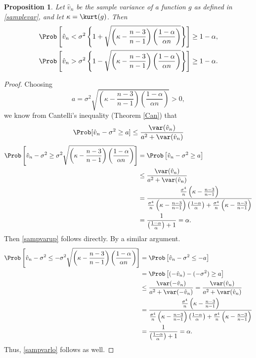 \documentclass[12pt]{amsart}
\newcommand{\hv}{\hat{v}}
\newtheorem{prop}[theorem]{Proposition}
\begin{document}
\begin{prop}\label{propCant} Let $\hv_n$ be the sample variance of a function $g$ as defined in \eqref{samplevar}, and let $\kappa=\kurt(g)$.  Then 
\begin{subequations} \label{sampvarbd}
\begin{gather}\label{sampvarup}
\Prob\left[\hv_n < \sigma^2 \left\{1 + \sqrt{\left ( \kappa  - \frac{n-3}{n-1}\right)\left(\frac{1-\alpha}{\alpha n}\right)}\right\} \right] \ge 1 - \alpha, \\
\label{sampvarlo}
\Prob\left[\hv_n > \sigma^2 \left\{1 - \sqrt{\left ( \kappa  - \frac{n-3}{n-1}\right)\left(\frac{1-\alpha}{\alpha n}\right)}\right\} \right] \ge 1 - \alpha.
\end{gather}
\end{subequations}
\end{prop}
\begin{proof}Choosing 
$$a=\sigma^2\sqrt{\left(\kappa-\frac{n-3}{n-1}\right)\left(\frac{1-\alpha}{\alpha n}\right)} >0,
$$
we know from Cantelli's inequality (Theorem \ref{Can})  that
$$\Prob[\hv_n-\sigma^2 \geq
a]\leq\frac{\var(\hv_n)}{a^2+\var(\hv_n)}$$
\begin{align*}
\Prob\left[\hv_n-\sigma^2 \geq
\sigma^2\sqrt{\left(\kappa-\frac{n-3}{n-1}\right)\left(\frac{1-\alpha}{\alpha n}\right)} \right] & = \Prob\left[\hv_n-\sigma^2 \geq
a \right]\\
& \leq\frac{\var(\hv_n)}{a^2+\var(\hv_n)}\\
&= \frac{\frac{\sigma^4}{n}\left(\kappa - \frac{n-3}{n-1}\right)}{\frac{\sigma^4}{n}\left(\kappa - \frac{n-3}{n-1}\right)\left(\frac{1-\alpha}{\alpha}\right)+\frac{\sigma^4}{n}\left(\kappa - \frac{n-3}{n-1}\right)} \\
&=\frac{1}{\left(\frac{1-\alpha}{\alpha}\right)+1}=\alpha.
\end{align*}
Then \eqref{sampvarup} follows directly.  By a similar argument.
\begin{align*}
\Prob\left[\hv_n-\sigma^2 \le
- \sigma^2\sqrt{\left(\kappa-\frac{n-3}{n-1}\right)\left(\frac{1-\alpha}{\alpha n}\right)} \right] & = \Prob\left[\hv_n-\sigma^2 \le -a \right]\\
& = \Prob\left[(-\hv_n)-(-\sigma^2) \ge a \right]\\& \leq\frac{\var(-\hv_n)}{a^2+\var(-\hv_n)}= \frac{\var(\hv_n)}{a^2+\var(\hv_n)}\\
&= \frac{\frac{\sigma^4}{n}\left(\kappa - \frac{n-3}{n-1}\right)}{\frac{\sigma^4}{n}\left(\kappa - \frac{n-3}{n-1}\right)\left(\frac{1-\alpha}{\alpha}\right)+\frac{\sigma^4}{n}\left(\kappa - \frac{n-3}{n-1}\right)} \\
&=\frac{1}{\left(\frac{1-\alpha}{\alpha}\right)+1}=\alpha.
\end{align*}
Thus, \eqref{sampvarlo} follows as well.
\end{proof}
\end{document}
